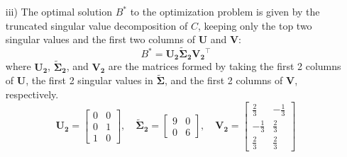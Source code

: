 \begin{homeworkProblem}
\begin{solution}
\begin{itemize}
                \item[iii)] The optimal solution $B^*$ to the optimization
                    problem is given by the truncated singular value 
                    decomposition of $C$, keeping only the top two singular 
                    values and the first two columns of $\mathbf{U}$ and 
                    $\mathbf{V}$:
                    \[
                        B^* = \mathbf{U_2} \mathbf{\tilde{\Sigma}_2} \mathbf{V_2}^\top
                    \]
                    where $\mathbf{U_2}$, $\mathbf{\tilde{\Sigma}_2}$, and 
                    $\mathbf{V_2}$ are the matrices formed by taking the first 
                    2 columns of $\mathbf{U}$, the first 2 singular values in
                    $\mathbf{\tilde{\Sigma}}$, and the first 2 columns of 
                    $\mathbf{V}$, respectively.
                    \[
                        \mathbf{U_2} = \begin{bmatrix}
                            0 & 0 \\
                            0 & 1 \\
                            1 & 0
                        \end{bmatrix}, \quad
                        \mathbf{\tilde{\Sigma}_2} = \begin{bmatrix}
                            9 & 0 \\
                            0 & 6
                        \end{bmatrix}, \quad
                        \mathbf{V_2} = \begin{bmatrix}
                            \frac{2}{3} & -\frac{1}{3} \\
                            -\frac{1}{3} & \frac{2}{3} \\
                            \frac{2}{3} & \frac{2}{3}
                        \end{bmatrix}
                    \]


\end{itemize}
\end{solution}
\end{homeworkProblem}
